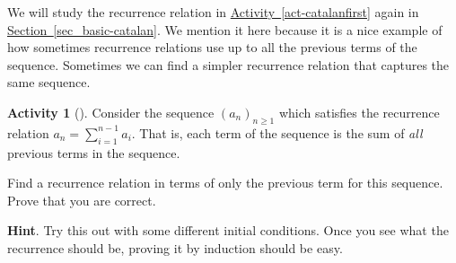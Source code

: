 \documentclass[10pt,]{book}
\theoremstyle{plain}
\theoremstyle{definition}
\theoremstyle{definition}
\theoremstyle{definition}
\newtheorem{activity}[project]{Activity}
\theoremstyle{definition}
\numberwithin{equation}{chapter}
\begin{document}
\hypertarget{p-822}{}%
We will study the recurrence relation in \hyperref[act-catalanfirst]{Activity~\ref{act-catalanfirst}} again in \hyperref[sec_basic-catalan]{Section~\ref{sec_basic-catalan}}.  We mention it here because it is a nice example of how sometimes recurrence relations use up to all the previous terms of the sequence.  Sometimes we can find a simpler recurrence relation that captures the same sequence.%
\begin{activity}[]\label{activity-85}
\hypertarget{p-823}{}%
Consider the sequence \((a_n)_{n \ge 1}\) which satisfies the recurrence relation \(a_n = \sum_{i = 1}^{n-1} a_i\).  That is, each term of the sequence is the sum of \emph{all} previous terms in the sequence.%
\par
\hypertarget{p-824}{}%
Find a recurrence relation in terms of only the previous term for this sequence.  Prove that you are correct.%
\par\smallskip%
\noindent\textbf{Hint}.\hypertarget{hint-78}{}\quad%
\hypertarget{p-825}{}%
Try this out with some different initial conditions.  Once you see what the recurrence should be, proving it by induction should be easy.%
\end{activity}
\typeout{************************************************}
\typeout{************************************************}
\end{document}
